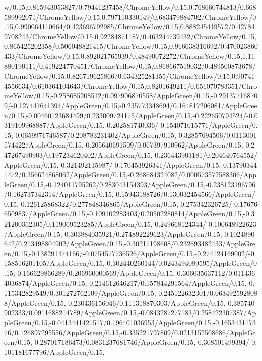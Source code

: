 {\begin{tikzternal}
{w/0.15,0.815943053827/0.79441237458/ChromeYellow/0.15,0.768660744813/0.668589992071/ChromeYellow/0.15,0.797110330149/0.683479884702/ChromeYellow/0.15,0.990064110664/0.423696792985/ChromeYellow/0.15,0.888245419572/0.427849708243/ChromeYellow/0.15,0.92284871187/0.463244739432/ChromeYellow/0.15,0.865425202358/0.506048821415/ChromeYellow/0.15,0.916638316692/0.470023860433/ChromeYellow/0.15,0.892021765939/0.48490072272/ChromeYellow/0.15,1.11880190111/0.419224770451/ChromeYellow/0.15,0.868667519032/0.489500873678/ChromeYellow/0.15,0.826719625866/0.634325281355/ChromeYellow/0.15,0.907414556634/0.610364104643/ChromeYellow/0.15,0.8201649211/0.651070783351/ChromeYellow/0.15,-0.258685208512/0.097906870558/AppleGreen/0.15,-0.291377168709/-0.127447641394/AppleGreen/0.15,-0.235773348694/0.164817206081/AppleGreen/0.15,-0.00460123684499/0.233009724175/AppleGreen/0.15,-0.222650794524/-0.0319109968887/AppleGreen/0.15,-0.202581740036/-0.154071015771/AppleGreen/0.15,-0.0659971746587/0.208783231402/AppleGreen/0.15,-0.32857694506/0.0113001574422/AppleGreen/0.15,-0.205640691509/0.067397910962/AppleGreen/0.15,-0.247267490903/0.197234620402/AppleGreen/0.15,-0.236443903181/0.204640764552/AppleGreen/0.15,-0.321492115987/-0.170453926341/AppleGreen/0.15,-0.137903441472/0.356624868062/AppleGreen/0.15,-0.268684324082/0.000573572588306/AppleGreen/0.15,-0.124011795262/0.283043154393/AppleGreen/0.15,-0.238123196796/0.162737342314/AppleGreen/0.15,-0.15943188726/0.130032454566/AppleGreen/0.15,-0.126125868322/0.277848346865/AppleGreen/0.15,-0.275342326725/-0.176766509837/AppleGreen/0.15,-0.109102283403/0.20502280814/AppleGreen/0.15,-0.321200362305/0.119069523285/AppleGreen/0.15,-0.249668124344/-0.100648922623/AppleGreen/0.15,-0.303884035921/0.274892229623/AppleGreen/0.15,-0.1024890642/0.213498804902/AppleGreen/0.15,-0.30217198608/0.232693482433/AppleGreen/0.15,-0.138291474166/-0.0754577736526/AppleGreen/0.15,-0.274124169002/-0.158516201105/AppleGreen/0.15,-0.302440260144/0.0243494089595/AppleGreen/0.15,-0.166629866289/0.206960000569/AppleGreen/0.15,-0.306035637112/0.0114364036874/AppleGreen/0.15,-0.214612646217/0.157844291564/AppleGreen/0.15,-0.115342829549/0.301272762109/AppleGreen/0.15,-0.245122632301/0.0634925928088/AppleGreen/0.15,-0.230436156046/0.111318870303/AppleGreen/0.15,-0.385740902333/0.0911688214789/AppleGreen/0.15,-0.0843287277183/0.258422307387/AppleGreen/0.15,-0.0413441421517/0.196401036953/AppleGreen/0.15,-0.165343117376/0.126897295556/AppleGreen/0.15,-0.335221797809/0.0213152508686/AppleGreen/0.15,-0.287017186473/0.0831237681746/AppleGreen/0.15,-0.308501499394/-0.101181677796/AppleGreen/0.15,
}
\end{tikzternal}}
